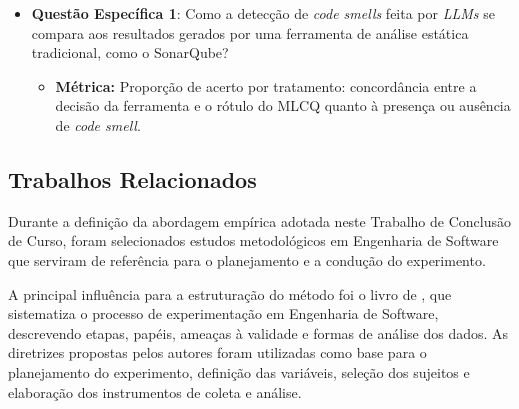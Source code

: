 \begin{itemize}
    \item \textbf{Questão Específica 1}: Como a detecção de \textit{code smells} feita por \textit{LLMs} se compara aos resultados gerados por uma ferramenta de análise estática tradicional, como o SonarQube?
    
    \begin{itemize}
        \item \textbf{Métrica:} Proporção de acerto por tratamento: concordância entre a decisão da ferramenta e o rótulo do MLCQ quanto à presença ou ausência de \textit{code smell}.
    \end{itemize}

    
\end{itemize}


\subsection{Trabalhos Relacionados}

Durante a definição da abordagem empírica adotada neste Trabalho de Conclusão de Curso, foram selecionados estudos
metodológicos em Engenharia de Software que serviram de referência para o planejamento e a condução do experimento. 

A principal influência para a estruturação do método foi o livro de , que sistematiza o processo de 
experimentação em Engenharia de Software, descrevendo etapas, papéis, ameaças à validade e formas de análise dos 
dados. As diretrizes propostas pelos autores foram utilizadas como base para o planejamento do experimento, definição das 
variáveis, seleção dos sujeitos e elaboração dos instrumentos de coleta e análise. 

